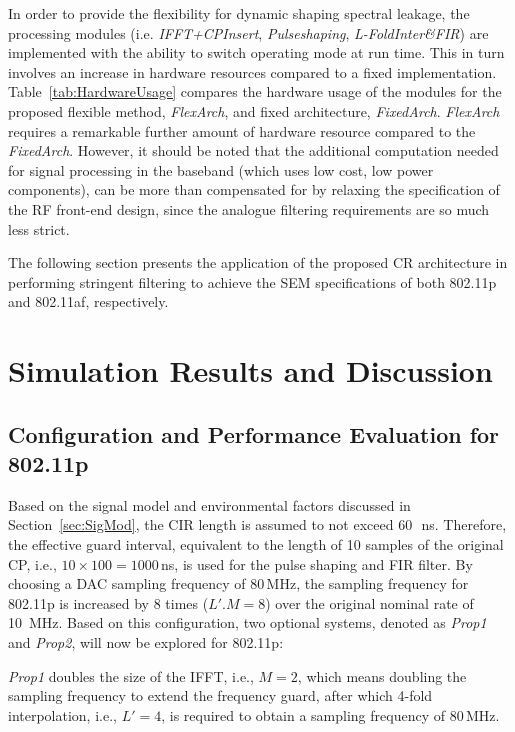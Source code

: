 In order to provide the flexibility for dynamic shaping spectral leakage, the processing modules (i.e. \emph{IFFT+CPInsert}, \emph{Pulseshaping}, \emph{L-FoldInter\&FIR}) are implemented with the ability to switch operating mode at run time. This in turn involves an increase in hardware resources compared to a fixed implementation. Table~\ref{tab:HardwareUsage} compares the hardware usage of the modules for the proposed flexible method, \emph{FlexArch}, and fixed architecture, \emph{FixedArch}.
\emph{FlexArch} requires a remarkable further amount of hardware resource compared to the \emph{FixedArch}.
However, it should be noted that the additional computation needed for signal processing in the baseband (which uses low cost, low power components), can be more than compensated for by relaxing the specification of the RF front-end design, since the analogue filtering requirements are so much less strict.

The following section presents the application of the proposed CR architecture in performing stringent filtering to achieve the SEM specifications of both 802.11p and 802.11af, respectively.

\section{Simulation Results and Discussion}
\subsection{Configuration and Performance Evaluation for 802.11p}
Based on the signal model and environmental factors discussed in Section~\ref{sec:SigMod}, the CIR length is assumed to not exceed 60\,~ns.
Therefore, the effective guard interval, equivalent to the length of 10 samples of the original CP, i.e., $10 \times 100=1000$\,ns, is used for the pulse shaping and FIR filter.
By choosing a DAC sampling frequency of 80\,MHz, the sampling frequency for 802.11p is increased by 8 times ($L'.M = 8$) over the original nominal rate of 10~MHz.
Based on this configuration, two optional systems, denoted as \emph{Prop1} and \emph{Prop2}, will now be explored for 802.11p:

\emph{Prop1} doubles the size of the IFFT, i.e., $M=2$, which means doubling the sampling frequency to extend the frequency guard, after which 4-fold interpolation, i.e., $L'=4$, is required to obtain a sampling frequency of 80\,MHz.

